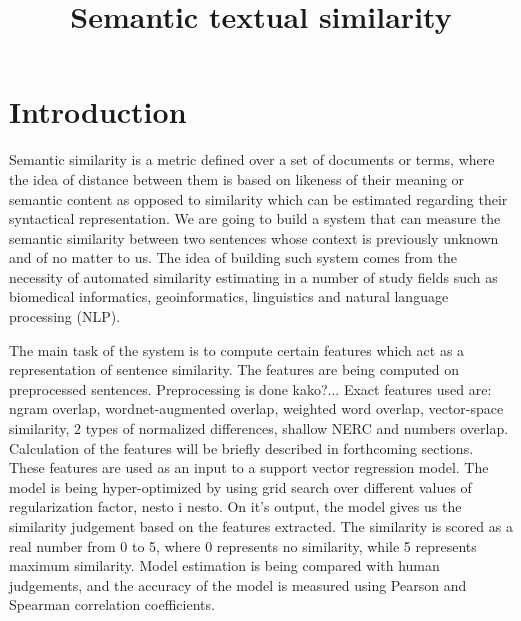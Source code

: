 \documentclass[10pt, a4paper]{article}
\title{Semantic textual similarity}
\begin{document}
\maketitleabstract

\section{Introduction}



Semantic similarity is a metric defined over a set of documents or terms, where the idea of distance between them is based on likeness of their meaning or semantic content as opposed to similarity which can be estimated regarding their syntactical representation. 
We are going to build a system that can measure the semantic similarity between two sentences whose context is previously unknown and of no matter to us. The idea of building such system comes from the necessity of automated similarity estimating in a number of study fields such as biomedical informatics, geoinformatics, linguistics and natural language processing (NLP).

The main task of the system is to compute certain features which act as a representation of sentence similarity. The features are being computed on preprocessed sentences. Preprocessing is done kako?... Exact features used are: ngram overlap, wordnet-augmented overlap, weighted word overlap, vector-space similarity, 2 types of normalized differences, shallow NERC and numbers overlap. Calculation of the features will be briefly described in forthcoming sections. These features are used as an input to a support vector regression model. The model is being hyper-optimized by using grid search over different values of regularization factor, nesto i nesto. On it's output, the model gives us the similarity judgement based on the features extracted. The similarity is scored as a real number from 0 to 5, where 0 represents no similarity, while 5 represents maximum similarity. Model estimation is being compared with human judgements, and the accuracy of the model is measured using Pearson and Spearman correlation coefficients.
\end{document}
